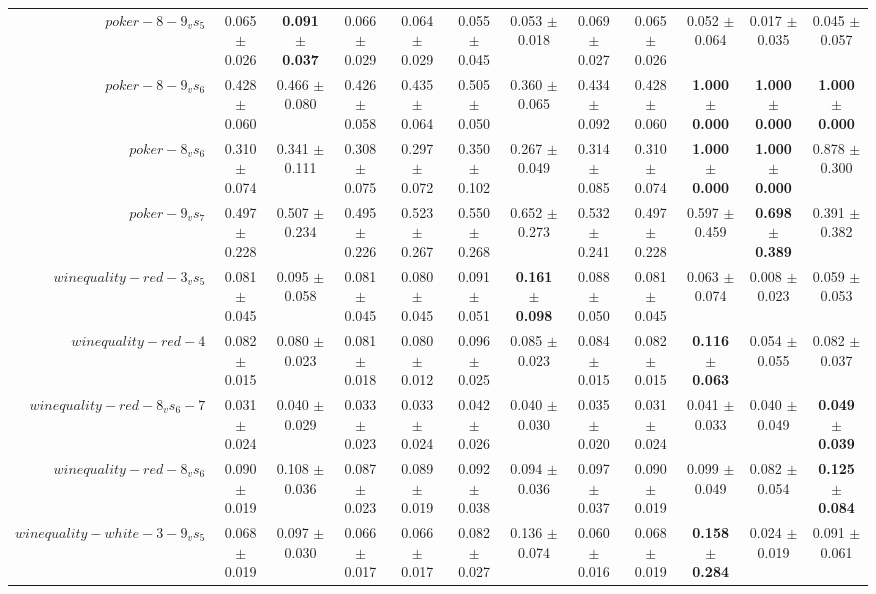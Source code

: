 \begin{table}[!ht]
{\begin{tabular}{r c c c c c c c c c c c}
$poker-8-9_vs_5$ & 0.065 $\pm$ 0.026 & \textbf{0.091 $\pm$ 0.037} & 0.066 $\pm$ 0.029 & 0.064 $\pm$ 0.029 & 0.055 $\pm$ 0.045 & 0.053 $\pm$ 0.018 & 0.069 $\pm$ 0.027 & 0.065 $\pm$ 0.026 & 0.052 $\pm$ 0.064 & 0.017 $\pm$ 0.035 & 0.045 $\pm$ 0.057 \\
$poker-8-9_vs_6$ & 0.428 $\pm$ 0.060 & 0.466 $\pm$ 0.080 & 0.426 $\pm$ 0.058 & 0.435 $\pm$ 0.064 & 0.505 $\pm$ 0.050 & 0.360 $\pm$ 0.065 & 0.434 $\pm$ 0.092 & 0.428 $\pm$ 0.060 & \textbf{1.000 $\pm$ 0.000} & \textbf{1.000 $\pm$ 0.000} & \textbf{1.000 $\pm$ 0.000} \\
$poker-8_vs_6$ & 0.310 $\pm$ 0.074 & 0.341 $\pm$ 0.111 & 0.308 $\pm$ 0.075 & 0.297 $\pm$ 0.072 & 0.350 $\pm$ 0.102 & 0.267 $\pm$ 0.049 & 0.314 $\pm$ 0.085 & 0.310 $\pm$ 0.074 & \textbf{1.000 $\pm$ 0.000} & \textbf{1.000 $\pm$ 0.000} & 0.878 $\pm$ 0.300 \\
$poker-9_vs_7$ & 0.497 $\pm$ 0.228 & 0.507 $\pm$ 0.234 & 0.495 $\pm$ 0.226 & 0.523 $\pm$ 0.267 & 0.550 $\pm$ 0.268 & 0.652 $\pm$ 0.273 & 0.532 $\pm$ 0.241 & 0.497 $\pm$ 0.228 & 0.597 $\pm$ 0.459 & \textbf{0.698 $\pm$ 0.389} & 0.391 $\pm$ 0.382 \\
$winequality-red-3_vs_5$ & 0.081 $\pm$ 0.045 & 0.095 $\pm$ 0.058 & 0.081 $\pm$ 0.045 & 0.080 $\pm$ 0.045 & 0.091 $\pm$ 0.051 & \textbf{0.161 $\pm$ 0.098} & 0.088 $\pm$ 0.050 & 0.081 $\pm$ 0.045 & 0.063 $\pm$ 0.074 & 0.008 $\pm$ 0.023 & 0.059 $\pm$ 0.053 \\
$winequality-red-4$ & 0.082 $\pm$ 0.015 & 0.080 $\pm$ 0.023 & 0.081 $\pm$ 0.018 & 0.080 $\pm$ 0.012 & 0.096 $\pm$ 0.025 & 0.085 $\pm$ 0.023 & 0.084 $\pm$ 0.015 & 0.082 $\pm$ 0.015 & \textbf{0.116 $\pm$ 0.063} & 0.054 $\pm$ 0.055 & 0.082 $\pm$ 0.037 \\
$winequality-red-8_vs_6-7$ & 0.031 $\pm$ 0.024 & 0.040 $\pm$ 0.029 & 0.033 $\pm$ 0.023 & 0.033 $\pm$ 0.024 & 0.042 $\pm$ 0.026 & 0.040 $\pm$ 0.030 & 0.035 $\pm$ 0.020 & 0.031 $\pm$ 0.024 & 0.041 $\pm$ 0.033 & 0.040 $\pm$ 0.049 & \textbf{0.049 $\pm$ 0.039} \\
$winequality-red-8_vs_6$ & 0.090 $\pm$ 0.019 & 0.108 $\pm$ 0.036 & 0.087 $\pm$ 0.023 & 0.089 $\pm$ 0.019 & 0.092 $\pm$ 0.038 & 0.094 $\pm$ 0.036 & 0.097 $\pm$ 0.037 & 0.090 $\pm$ 0.019 & 0.099 $\pm$ 0.049 & 0.082 $\pm$ 0.054 & \textbf{0.125 $\pm$ 0.084} \\
$winequality-white-3-9_vs_5$ & 0.068 $\pm$ 0.019 & 0.097 $\pm$ 0.030 & 0.066 $\pm$ 0.017 & 0.066 $\pm$ 0.017 & 0.082 $\pm$ 0.027 & 0.136 $\pm$ 0.074 & 0.060 $\pm$ 0.016 & 0.068 $\pm$ 0.019 & \textbf{0.158 $\pm$ 0.284} & 0.024 $\pm$ 0.019 & 0.091 $\pm$ 0.061 \\

\end{tabular}}
\end{table}
